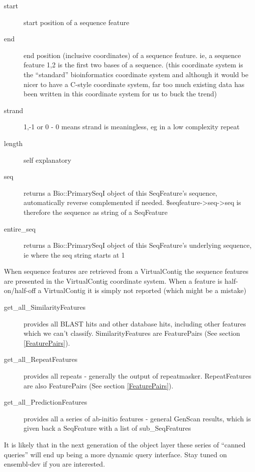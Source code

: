 \documentclass[11pt,a4paper]{article}
\begin{document}
\begin{description}
\item[start] start position of a sequence feature
\item[end] end position (inclusive coordinates) of a sequence
feature. ie, a sequence feature 1,2 is the first two bases of a
sequence. (this coordinate system is the ``standard'' bioinformatics coordinate system
and although it would be nicer to have a C-style coordinate system, far too much existing data
has been written in this coordinate system for us to buck the trend)
\item[strand] 1,-1 or 0 - 0 means strand is meaningless, eg in a low complexity repeat
\item[length] self explanatory
\item[seq] returns a Bio::PrimarySeqI object of this SeqFeature's sequence, automatically reverse complemented if
needed. \$seqfeature->seq->seq is therefore the sequence as string of a SeqFeature
\item[entire\_seq] returns a Bio::PrimarySeqI object of this SeqFeature's underlying sequence, ie where the
seq string starts at 1
\end{description}
 
When sequence features are retrieved from a VirtualContig the sequence features are presented
in the VirtualContig coordinate system. When a feature is half-on/half-off a VirtualContig it
is simply not reported (which might be a mistake)

\begin{description}

\item[get\_all\_SimilarityFeatures] provides all BLAST hits and other
database hits, including other features which we can't
classify. SimilarityFeatures are FeaturePairs (See section
\ref{FeaturePairs}).

\item[get\_all\_RepeatFeatures] provides all repeats - generally the
output of repeatmasker. RepeatFeatures are also FeaturePairs (See
section \ref{FeaturePairs}).

\item[get\_all\_PredictionFeatures] provides all a series of ab-initio
features - general GenScan results, which is given back a SeqFeature
with a list of sub\_SeqFeatures

\end{description}

It is likely that in the next generation of the object layer these
series of ``canned queries'' will end up being a more dynamic query
interface. Stay tuned on ensembl-dev if you are interested.
\end{document}

